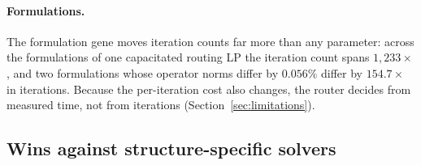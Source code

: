 \begin{table}[t]
\centering
\small
{}
\caption{Per-call cost of the box-hyperplane projection, from per-device
calibration in the gene pool. ``Unseen instances'' counts held-out instances on
which a solver using the operator reaches the target.}
\label{tab:operators}
\end{table}

\paragraph{Formulations.} The formulation gene moves iteration counts far more
than any parameter: across the formulations of one capacitated routing LP the
iteration count spans $1{,}233\times$, and two formulations whose operator norms
differ by $0.056\%$ differ by $154.7\times$ in iterations. Because the
per-iteration cost also changes, the router decides from measured time, not
from iterations (Section~\ref{sec:limitations}).

\subsection{Wins against structure-specific solvers}

